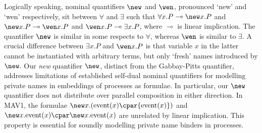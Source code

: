 \documentclass[UKenglish,acmsmall,authorversion]{acmart}
\theoremstyle{plain}
\begin{document}
Logically speaking, nominal quantifiers $\new$ and $\wen$, pronounced `new' and `wen' respectively, sit between $\forall$ and $\exists$ such that
$
\forall x. P \multimap \new x. P
$
and
$
\new x. P \multimap \wen x. P
$ and
$
\wen x. P \multimap \exists x. P
$, where $\multimap$ is linear implication.
The quantifier $\new$ is similar in some respects to $\forall$, whereas $\wen$
is similar to $\exists.$ A crucial difference between $\exists x. P$
and $\wen x. P$ is that variable $x$ in the latter cannot be instantiated with arbitrary terms,
but only `fresh' names introduced by $\new.$
%
Our \textit{new} quantifier $\new$, distinct from the Gabbay-Pitts quantifier, addresses limitations of established self-dual nominal quantifiers for modelling private names in embeddings of processes as formulae. 
In particular, our $\new$ quantifier does not distribute over parallel composition in either direction.
In \textsf{MAV1}, the formulae
$
\mathopen{\new x.}({\mathrm{event}(x)} \cpar {\mathrm{event}(x)})
$ and
$
\new x.{\mathrm{event}(x)} \cpar \new x.{\mathrm{event}(x)}
$
are unrelated by linear implication. This property is essential for soundly modelling private name binders in processes.

\end{document}
